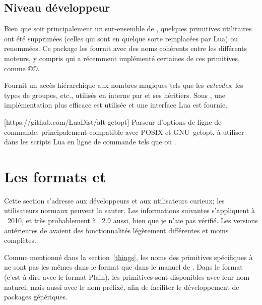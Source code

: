 \documentclass{lltxdoc}
\begin{document}
\subsection{Niveau développeur}

Bien que \luatex soit principalement un sur-ensemble de \pdftex, quelques
primitives utilitaires ont été supprimées (celles qui sont en quelque sorte
remplacées par Lua) ou renommées. Ce package les fournit avec des noms cohérents
entre les différents moteurs, y compris \xetex qui a récemment implémenté
certaines de ces primitives, comme ©\strcmp©.

Fournit un accès hiérarchique aux \og{}nombres magiques\fg{} tels que
les \emph{catcodes}, les types de groupes, etc., utilisés en interne par \tex
et ses héritiers. Sous \luatex, une implémentation plus efficace est
utilisée et une interface Lua est fournie.

[https://github.com/LuaDist/alt-getopt]
Parseur d'options de ligne de commande, principalement compatible avec POSIX
et GNU~getopt, à utiliser dans les scripts Lua en ligne de commande tels
que  ou .

\section{Les formats  et }\label{formats}

Cette section s'adresse aux développeurs et aux utilisateurs curieux;
les utilisateurs normaux peuvent la sauter. Les informations suivantes
s'appliquent à \texlive{}~2010, et très probablement à \miktex{}~2.9 aussi,
bien que je n'aie pas vérifié. Les versions antérieures de \texlive avaient
des fonctionnalités légèrement différentes et moins complètes.


Comme mentionné dans la section~\ref{things}, les noms des primitives spécifiques
à \luatex ne sont pas les mêmes dans le format  que dans le manuel
de \luatex. Dans le format  (c'est-à-dire \luatex avec le format Plain),
les primitives sont disponibles avec leur nom naturel, mais aussi avec le nom préfixé,
afin de faciliter le développement de packages génériques.
\end{document}
